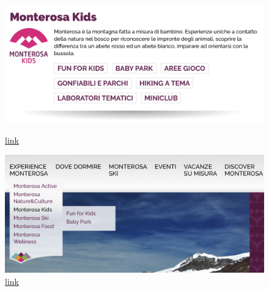 \documentclass[a4paper, 11pt, parskip=half, headsepline]{scrreprt}
\begin{document}
\begin{figure}[H]
    \begin{minipage}[t]{0.5\textwidth}
        \centering
        \includegraphics[width=1\linewidth, keepaspectratio]{13-interaction-consistency}
        \caption{\href{https://www.visitmonterosa.com/experience-monterosa/}{link}}
        \label{fig:interaction-consistency-03}
    \end{minipage}   
    \hspace*{\fill}
    \begin{minipage}[t]{0.5\textwidth}
        \centering
        \includegraphics[width=1\linewidth, keepaspectratio]{14-interaction-consistency}
        \caption{\href{https://www.visitmonterosa.com}{link}}
        \label{fig:interaction-consistency-04}
    \end{minipage} 
\end{figure}
\end{document}
